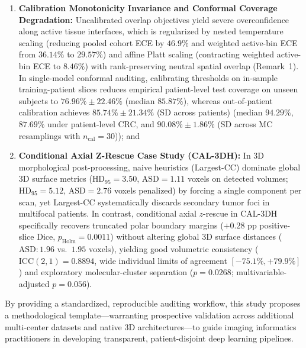 \documentclass[11pt,a4paper]{article}
\begin{document}
\begin{enumerate}
    \item \textbf{Calibration Monotonicity Invariance and Conformal Coverage Degradation:} Uncalibrated overlap objectives yield severe overconfidence along active tissue interfaces, which is regularized by nested temperature scaling (reducing pooled cohort ECE by $46.9\%$ and weighted active-bin ECE from $36.14\%$ to $29.57\%$) and affine Platt scaling (contracting weighted active-bin ECE to $8.46\%$) with rank-preserving neutral spatial overlap (Remark~1). In single-model conformal auditing, calibrating thresholds on in-sample training-patient slices reduces empirical patient-level test coverage on unseen subjects to $76.96\% \pm 22.46\%$ (median $85.87\%$), whereas out-of-patient calibration achieves $85.74\% \pm 21.34\%$ (SD across patients) (median $94.29\%$, $87.69\%$ under patient-level CRC, and $90.08\% \pm 1.86\%$ (SD across MC resamplings with $n_{\text{cal}} = 30$)); and
    \item \textbf{Conditional Axial Z-Rescue Case Study (CAL-3DH):} In 3D morphological post-processing, naive heuristics (Largest-CC) dominate global 3D surface metrics ($\text{HD}_{95} = 3.50$, $\text{ASD} = 1.11$ voxels on detected volumes; $\text{HD}_{95} = 5.12$, $\text{ASD} = 2.76$ voxels penalized) by forcing a single component per scan, yet Largest-CC systematically discards secondary tumor foci in multifocal patients. In contrast, conditional axial $z$-rescue in CAL-3DH specifically recovers truncated polar boundary margins ($+0.28\text{ pp}$ positive-slice Dice, $p_{\text{Holm}} = 0.0011$) without altering global 3D surface distances ($\text{ASD}: 1.96$ vs.\ $1.95\text{ voxels}$), yielding good volumetric consistency ($\text{ICC}(2,1) = 0.8894$, wide individual limits of agreement $[-75.1\%, +79.9\%]$) and exploratory molecular-cluster separation ($p = 0.0268$; multivariable-adjusted $p = 0.056$).
\end{enumerate}

By providing a standardized, reproducible auditing workflow, this study proposes a methodological template---warranting prospective validation across additional multi-center datasets and native 3D architectures---to guide imaging informatics practitioners in developing transparent, patient-disjoint deep learning pipelines.
\end{document}
